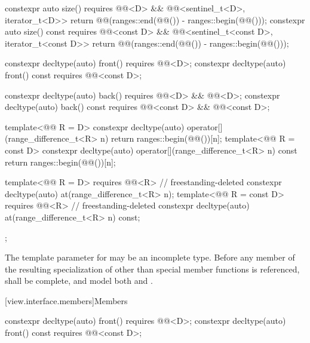 \begin{codeblock}
{{    constexpr auto size() requires @@<D> &&
      @@<sentinel_t<D>, iterator_t<D>> {
        return @@(ranges::end(@@()) - ranges::begin(@@()));
      }
    constexpr auto size() const requires @@<const D> &&
      @@<sentinel_t<const D>, iterator_t<const D>> {
        return @@(ranges::end(@@()) - ranges::begin(@@()));
      }

    constexpr decltype(auto) front() requires @@<D>;
    constexpr decltype(auto) front() const requires @@<const D>;

    constexpr decltype(auto) back() requires @@<D> && @@<D>;
    constexpr decltype(auto) back() const
      requires @@<const D> && @@<const D>;

    template<@@ R = D>
      constexpr decltype(auto) operator[](range_difference_t<R> n) {
        return ranges::begin(@@())[n];
      }
    template<@@ R = const D>
      constexpr decltype(auto) operator[](range_difference_t<R> n) const {
        return ranges::begin(@@())[n];
      }

    template<@@ R = D> requires @@<R>              // freestanding-deleted
      constexpr decltype(auto) at(range_difference_t<R> n);
    template<@@ R = const D> requires @@<R>        // freestanding-deleted
      constexpr decltype(auto) at(range_difference_t<R> n) const;
  };
}
\end{codeblock}

\pnum
The template parameter  for  may be an
incomplete type. Before any member of the resulting specialization of
 other than special member functions
is referenced,  shall be complete, and
model both  and .

[view.interface.members]{Members}

%
\begin{itemdecl}
constexpr decltype(auto) front() requires @@<D>;
constexpr decltype(auto) front() const requires @@<const D>;
\end{itemdecl}

